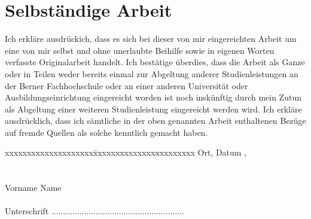 \chapter*{Selbständige Arbeit}
\label{ch:Selbständige Arbeit}
Ich erkläre ausdrückich, dass es sich bei dieser von mir eingereichten Arbeit um eine von mir selbst und ohne unerlaubte Beihilfe sowie in eigenen Worten verfasste Originalarbeit handelt.
Ich bestätige überdies, dass die Arbeit als Ganze oder in Teilen weder bereits einmal zur Abgeltung anderer Studienleistungen an der Berner Fachhochschule oder an einer anderen Universität oder Ausbildungseinrichtung eingereicht worden ist noch inskünftig durch mein Zutun als Abgeltung einer weiteren Studienleistung eingereicht werden wird.
Ich erkläre ausdrücklich, dass ich sämtliche in der oben genannten Arbeit enthaltenen Bezüge auf fremde Quellen als solche kenntlich gemacht haben.
\vspace{2cm}
\begin{tabbing}
xxxxxxxxxxxxxxxxxxxx\=xxxxxxxxxxxxxxxxxxxxxxx \kill
Ort, Datum      \>  \Ort, \Datum \\ \\ \\

Vorname Name    \> \AutorA \\  \\ 
Unterschrift    \> ......................................................... \\ \\  \\ 
\end{tabbing}
